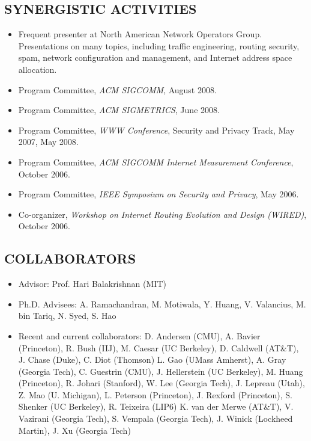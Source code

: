 \documentclass[11pt]{article}
\begin{document}
\subsection*{SYNERGISTIC ACTIVITIES} 
\begin{itemize}
\item Frequent presenter at North American Network Operators Group.
  Presentations on many topics, including traffic engineering, routing
  security, spam, network configuration and management, and Internet
  address space allocation.

\item Program Committee, {\em ACM SIGCOMM}, August 2008.

\item Program Committee, {\em ACM SIGMETRICS}, June 2008.

\item Program Committee, {\em WWW Conference}, Security and
  Privacy Track, May 2007, May 2008.

\item Program Committee, {\em ACM SIGCOMM Internet Measurement
  Conference}, October 2006.

\item Program Committee, {\em IEEE Symposium on Security and
  Privacy}, May 2006.

\item Co-organizer, {\em Workshop on Internet Routing Evolution and
  Design (WIRED)}, October 2006.


\end{itemize}

\subsection*{COLLABORATORS} 

\begin{itemize}
\itemsep=-1pt
\item
Advisor: Prof. Hari Balakrishnan (MIT)

\item
Ph.D. Advisees: A. Ramachandran, M. Motiwala, Y. Huang, V. Valancius,
M. bin Tariq, N. Syed, S. Hao

\item
Recent and current collaborators:
D. Andersen (CMU),
A. Bavier (Princeton),
R. Bush (IIJ),
M. Caesar (UC Berkeley),
D. Caldwell (AT\&T),
J. Chase (Duke),
C. Diot (Thomson)
L. Gao (UMass Amherst),
A. Gray (Georgia Tech),
C. Guestrin (CMU),
J. Hellerstein (UC Berkeley),
M. Huang (Princeton),
R. Johari (Stanford), 
W. Lee (Georgia Tech),
J. Lepreau (Utah),
Z. Mao (U. Michigan),
L. Peterson (Princeton),
J. Rexford (Princeton),
S. Shenker (UC Berkeley),
R. Teixeira (LIP6)
K. van der Merwe (AT\&T),
V. Vazirani (Georgia Tech), 
S. Vempala (Georgia Tech),
J. Winick (Lockheed Martin), 
J. Xu (Georgia Tech)
\end{itemize}
\end{document}

